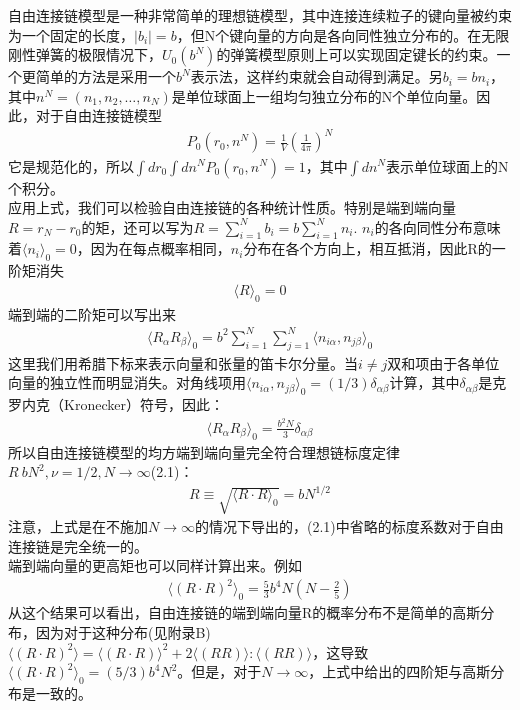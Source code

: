 自由连接链模型是一种非常简单的理想链模型，其中连接连续粒子的键向量被约束为一个固定的长度，$|b_{i}|=b$，但N个键向量的方向是各向同性独立分布的。在无限刚性弹簧的极限情况下，$U_0(b^{N})$的弹簧模型原则上可以实现固定键长的约束。一个更简单的方法是采用一个$b^{N}$表示法，这样约束就会自动得到满足。另$b_{i}=bn_{i}$，其中$n^{N}=(n_1,n_2,\ldots,n_{N})$是单位球面上一组均匀独立分布的N个单位向量。因此，对于自由连接链模型\\
\begin{gather}
P_0(r_0,n^{N})=\frac{1}{V} (\frac{1}{4 \pi})^{N}
\end{gather}
它是规范化的，所以$\int dr_0\int dn^{N}P_0(r_0,n^{N})=1$，其中$\int dn^{N}$表示单位球面上的N个积分。\\
应用上式，我们可以检验自由连接链的各种统计性质。特别是端到端向量$R=r_{N}-r_0$的矩，还可以写为$R=\sum _{i=1}^{N} b_{i}=b \sum _{i=1}^{N} n_{i}$.
$n_{i}$的各向同性分布意味着$\langle n_{i}\rangle _{0}=0$，因为在每点概率相同，$n_{i}$分布在各个方向上，相互抵消，因此R的一阶矩消失\\
\begin{gather}
\langle R \rangle_{0}=0
\end{gather}
端到端的二阶矩可以写出来\\
\begin{gather}
\langle R_{\alpha} R_{\beta}\rangle_{0}=b^2 \sum _{i=1}^{N} \sum _{j=1}^{N} \langle n_{i \alpha},n_{j \beta} \rangle_{0}
\end{gather}
这里我们用希腊下标来表示向量和张量的笛卡尔分量。当$i\neq j$双和项由于各单位向量的独立性而明显消失。对角线项用$\langle n_{i \alpha},n_{j \beta} \rangle_{0}=(1/3)\delta_{\alpha  \beta }$计算，其中$\delta_{\alpha \beta }$是克罗内克（Kronecker）符号，因此：\\
\begin{gather}
\langle R_{\alpha} R_{\beta}\rangle_{0}=\frac{b^{2}N}{3}\delta_{\alpha \beta }
\end{gather}
所以自由连接链模型的均方端到端向量完全符合理想链标度定律$R~bN^2,\nu=1/2,N \rightarrow \infty $(2.1)：\\
\begin{gather}
R\equiv \sqrt{\langle R \cdot R\rangle _{0}}=bN^{1/2}
\end{gather}
注意，上式是在不施加$N\rightarrow \infty$的情况下导出的，(2.1)中省略的标度系数对于自由连接链是完全统一的。\\

端到端向量的更高矩也可以同样计算出来。例如\\
\begin{gather}
\langle (R \cdot R)^2 \rangle_{0}=\frac{5}{3}b^4N(N-\frac{2}{5})
\end{gather}
从这个结果可以看出，自由连接链的端到端向量R的概率分布不是简单的高斯分布，因为对于这种分布(见附录B)$\langle (R \cdot R)^2 \rangle=\langle (R \cdot R) \rangle^2+2\langle (R R)\rangle:\langle (R R)\rangle$，这导致$\langle (R \cdot R)^2 \rangle_{0}=(5/3)b^4N^2$。但是，对于$N\rightarrow \infty$，上式中给出的四阶矩与高斯分布是一致的。\\

